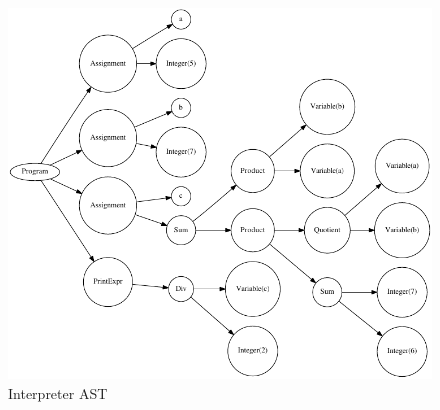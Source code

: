 \begin{figure}[!htb]
	\centering
		\includegraphics{simple_interpreter_tree.pdf}
	\caption{Interpreter AST}
	\label{fig:interpreter_tree}
\end{figure}

